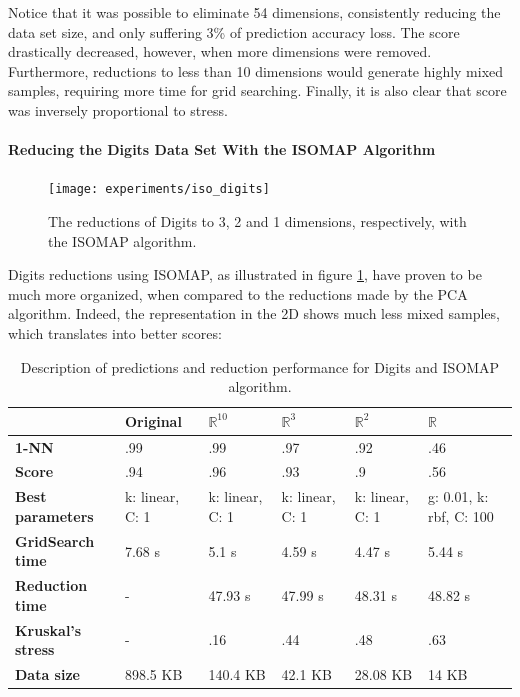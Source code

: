 Notice that it was possible to eliminate 54 dimensions, consistently reducing the data set size, and only suffering 3\% of prediction accuracy loss. The score drastically decreased, however, when more dimensions were removed. Furthermore, reductions to less than 10 dimensions would generate highly mixed samples, requiring more time for grid searching. Finally, it is also clear that score was inversely proportional to stress.

\paragraph{Reducing the Digits Data Set With the ISOMAP Algorithm}

\begin{figure}[H]
	\centering
	\captionsetup{justification=centering}
	\texttt{[image: experiments/iso\_digits]}
	\caption{The reductions of Digits to 3, 2 and 1 dimensions, respectively, with the ISOMAP algorithm.}
	\label{fig:dsdigitsiso}
\end{figure}

Digits reductions using ISOMAP, as illustrated in figure \ref{fig:dsdigitsiso}, have proven to be much more organized, when compared to the reductions made by the PCA algorithm. Indeed, the representation in the 2D shows much less mixed samples, which translates into better scores:

\begin{table}[H]
	\centering
	
	\begin{tabular}{|p{.14\linewidth}|p{.14\linewidth}|p{.14\linewidth}|p{.14\linewidth}|p{.14\linewidth}|p{.14\linewidth}|}
		\hline
		& \textbf{Original} & $\mathbb{R}^{10}$ & $\mathbb{R}^3$ & $\mathbb{R}^2$ & $\mathbb{R}$ \\\hline
		\textbf{1-NN} & .99 & .99 & .97 & .92 & .46 \\\hline
		\textbf{Score} & .94 & .96 & .93 & .9 & .56 \\\hline
		\textbf{Best parameters} & k: linear, C: 1 & k: linear, C: 1 & k: linear, C: 1 & k: linear, C: 1 & g: 0.01, k: rbf, C: 100 \\\hline
		\textbf{GridSearch time} & 7.68 s & 5.1 s & 4.59 s & 4.47 s & 5.44 s \\\hline
		\textbf{Reduction time} & - & 47.93 s & 47.99 s & 48.31 s & 48.82 s \\\hline
		\textbf{Kruskal's stress} & - & .16 & .44 & .48 & .63 \\\hline
		\textbf{Data size} & 898.5 KB & 140.4 KB & 42.1 KB & 28.08 KB & 14 KB \\\hline
	\end{tabular}
	
	\caption{Description of predictions and reduction performance for Digits and ISOMAP algorithm.}
\end{table}

